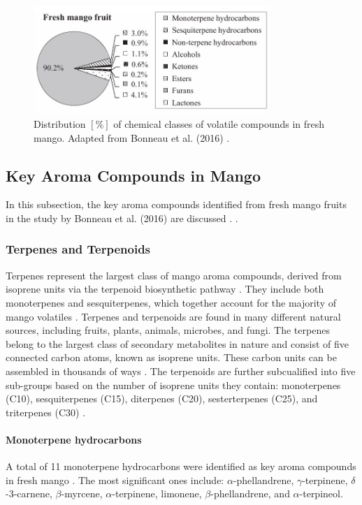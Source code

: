 \begin{figure}
    \centering
    \includegraphics[width=0.8\textwidth]{Figures/fig_fresh_mango_chemical_classes.JPG}
    \caption{Distribution $[\%]$ of chemical classes of volatile compounds in fresh mango. Adapted from Bonneau et al. (2016) \cite*{A07_Bonneau2016}.}
    \label{fig:mango_aroma_compounds}
\end{figure}

\subsection{Key Aroma Compounds in Mango}
In this subsection, the key aroma compounds identified from fresh mango fruits in the study by Bonneau et al. (2016) are discussed \cite*{A07_Bonneau2016}. .

\subsubsection*{Terpenes and Terpenoids}
Terpenes represent the largest class of mango aroma compounds, derived from isoprene units via the terpenoid biosynthetic pathway \cite*{A09_Barras2024}. They include both monoterpenes and sesquiterpenes, which together account for the majority of mango volatiles \cite*{A07_Bonneau2016}. Terpenes and terpenoids are found in many different natural sources, including fruits, plants, animals, microbes, and fungi. The terpenes belong to the largest class of secondary metabolites in nature and consist of five connected carbon atoms, known as isoprene units. These carbon units can be assembled in thousands of ways \cite*{B01_TerpenesTerpenoids_2018}. The terpenoids are further subcualified into five sub-groups based on the number of isoprene units they contain: monoterpenes (C10), sesquiterpenes (C15), diterpenes (C20), sesterterpenes (C25), and triterpenes (C30) \cite*{B01_TerpenesTerpenoids_2018}.


\paragraph*{Monoterpene hydrocarbons}
A total of 11 monoterpene hydrocarbons were identified as key aroma compounds in fresh mango \cite*{A07_Bonneau2016}. The most significant ones include: $\alpha$-phellandrene, $\gamma$-terpinene, $\delta$-3-carnene, $\beta$-myrcene, $\alpha$-terpinene, limonene, $\beta$-phellandrene, and $\alpha$-terpineol. 

